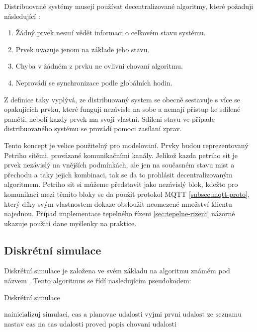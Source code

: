 Distribuované systémy musejí používat decentralizované algoritmy, které požaduji následující \cite[p.20]{distributed_systems}:
\begin{enumerate}
  \item Žádný prvek nesmí vědět informaci o celkovém stavu systému.
  \item Prvek uvazuje jenom na základe jeho stavu.
  \item Chyba v žádném z prvku ne ovlivni chovaní algoritmu.
  \item Neprovádí se synchronizace podle globálních hodin.
\end{enumerate}

Z definice taky vyplývá, ze distribuovaný system se obecně sestavuje s více se opakujících prvku, které funguji nezávisle na sobe a nemají přistup ke sdílené paměti, neboli kazdy prvek ma svoji vlastni. Sdíleni stavu ve případe distribuovaného systému se provádí pomoci zasílaní zprav.

Tento koncept je velice použitelný pro modelovaní. Prvky budou reprezentovaný Petriho sítěmi, provázané komunikačními kanály. Jelikož kazda petriho sit je prvek nezávislý na vnějších podmínkách, ale jen na současném stavu mist a přechodu a taky jejich kombinaci, tak se da to prohlásit decentralizovaným algoritmem. Petriho sit si můžeme představit jako nezávislý blok, kdežto pro komunikaci mezi těmito bloky se da použit protokol MQTT \ref{subsec:mqtt-proto}, který díky svým vlastnostem dokaze obsloužit neomezené množství klientu najednou. Případ implementace tepelného řízeni \ref{sec:tepelne-rizeni} názorné ukazuje použiti dane myšlenky na praktice.

\subsection{Diskrétní simulace}
\label{subsec:disc-sim}

Diskrétní simulace je založena ve svém základu na algoritmu známém pod názvem . Tento algoritmus se řídí nasledujícím pseudokodem:
\begin{algorithm}
  \caption{Diskrétní simulace}\label{euclid}
  \begin{algorithmic}[1]
  \State $\text{nainicializuj simulaci, cas a planovac udalosti}$
  \State $\text{vyjmi prvni udalost ze seznamu}$
    \Return
  \EndIf
  \State $\text{nastav cas na cas udalosti}$
  \State $\text{proved popis chovani udalosti}$
  \EndWhile
  \end{algorithmic}
\end{algorithm}


